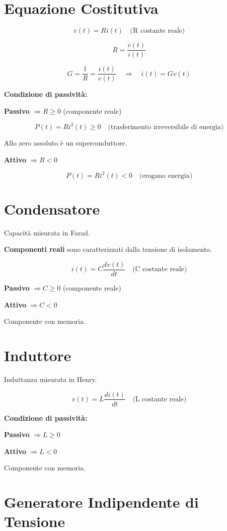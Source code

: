 \section*{Equazione Costitutiva}

\[
v(t) = R i(t) \quad \text{(R costante reale)}
\]

\[
R = \frac{v(t)}{i(t)}
\]

\[
G = \frac{1}{R} = \frac{i(t)}{v(t)} \quad \Rightarrow \quad i(t) = G v(t)
\]

\textbf{Condizione di passività:}

\textbf{Passivo} $\Rightarrow R \geq 0$ (componente reale)

\[
P(t) = R i^2(t) \geq 0 \quad \text{(trasferimento irreversibile di energia)}
\]

Allo zero assoluto è un superconduttore.

\textbf{Attivo} $\Rightarrow R < 0$

\[
P(t) = R i^2(t) < 0 \quad \text{(erogano energia)}
\]

\section*{Condensatore}

Capacità misurata in Farad.

\textbf{Componenti reali} sono caratterizzati dalla tensione di isolamento.

\[
i(t) = C \frac{d v(t)}{dt} \quad \text{(C costante reale)}
\]

\textbf{Passivo} $\Rightarrow C \geq 0$ (componente reale)

\textbf{Attivo} $\Rightarrow C < 0$

Componente con memoria.

\section*{Induttore}

Induttanza misurata in Henry.

\[
v(t) = L \frac{d i(t)}{dt} \quad \text{(L costante reale)}
\]

\textbf{Condizione di passività:}

\textbf{Passivo} $\Rightarrow L \geq 0$

\textbf{Attivo} $\Rightarrow L < 0$

Componente con memoria.

\section*{Generatore Indipendente di Tensione}

